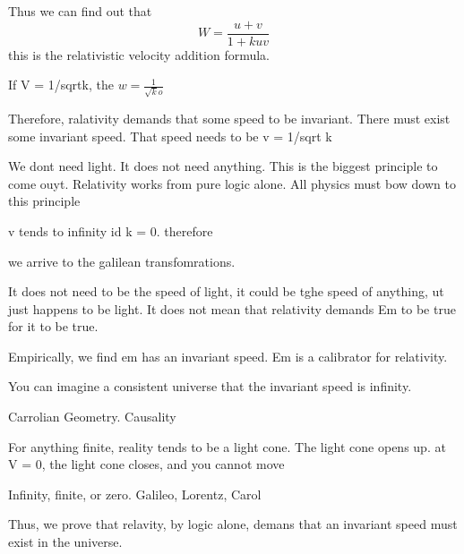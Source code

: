 Thus we can find out that 
\begin{equation}
    W = \frac{u+v}{1 + kuv} 
\end{equation}
this is the relativistic velocity addition formula.

If V = 1/sqrt{k}, the $w= \frac{1}{\sqrt ko} $

Therefore, ralativity demands that some speed to be invariant.
There must exist some invariant speed. That speed needs to be v = 1/sqrt k

We dont need light. It does not need anything.
This is the biggest principle to come ouyt. Relativity works from pure logic alone.
All physics must bow down to this principle

v tends to infinity id k = 0. therefore

we arrive to the galilean transfomrations.

It does not need to be the speed of light, it could be tghe speed of anything, ut just happens to be light.
It does not mean that relativity demands Em to be true for it to be true. 

Empirically, we find em has an invariant speed. Em is a calibrator for relativity.

You can imagine a consistent universe that the invariant speed is infinity. 

Carrolian Geometry.  Causality 

For anything finite, reality tends to be a light cone. 
The light cone opens up.
at V = 0, the light cone closes, and you cannot move

Infinity, finite, or zero. 
Galileo, Lorentz, Carol

Thus, we prove that relavity, by logic alone, demans that an invariant speed must exist in the universe.
